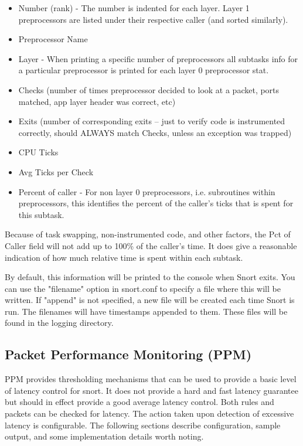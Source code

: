 \documentclass[english]{report}
\begin{document}
\begin{itemize}

\item Number (rank) - The number is indented for each layer.  Layer 1
preprocessors are listed under their respective caller (and sorted similarly).

\item Preprocessor Name

\item Layer - When printing a specific number of preprocessors all subtasks
info for a particular preprocessor is printed for each layer 0 preprocessor
stat.

\item Checks (number of times preprocessor decided to look at a packet, ports
matched, app layer header was correct, etc)

\item Exits  (number of corresponding exits -- just to verify code is
instrumented correctly, should ALWAYS match Checks, unless an exception was
trapped)

\item CPU Ticks

\item Avg Ticks per Check

\item Percent of caller - For non layer 0 preprocessors, i.e. subroutines
within preprocessors, this identifies the percent of the caller's ticks that is
spent for this subtask.

\end{itemize}

Because of task swapping, non-instrumented code, and other factors, the Pct of
Caller field will not add up to 100\% of the caller's time.  It does give a
reasonable indication of how much relative time is spent within each subtask.

By default, this information will be printed to the console when Snort exits.
You can use the "filename" option in snort.conf to specify a file where this
will be written. If "append" is not specified, a new file will be created each
time Snort is run. The filenames will have timestamps appended to them. These
files will be found in the logging directory.

\subsection{Packet Performance Monitoring (PPM)}
\label{ppm}
PPM provides thresholding mechanisms that can be used to provide a basic
level of latency control for snort.  It does not provide a hard and fast
latency guarantee but should in effect provide a good average latency
control.  Both rules and packets can be checked for latency.  The action
taken upon detection of excessive latency is configurable.  The following
sections describe configuration, sample output, and some implementation
details worth noting.
\end{document}
